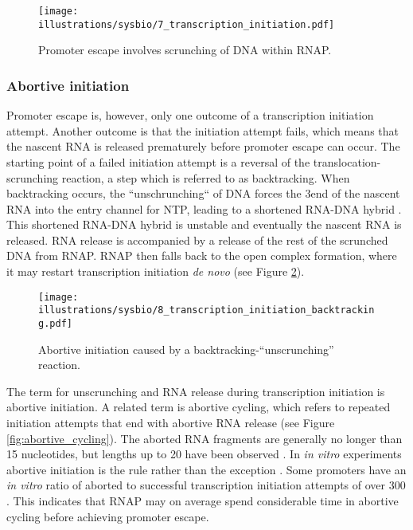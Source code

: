 \begin{figure}[htb]
	\begin{center}
		\texttt{[image: illustrations/sysbio/7\_transcription\_initiation.pdf]}
	\end{center}
	\caption{Promoter escape involves scrunching of DNA within RNAP.}
	\label{fig:simple_escape}
\end{figure}

\subsubsection{Abortive initiation}
Promoter escape is, however, only one outcome of a transcription initiation
attempt. Another outcome is that the initiation attempt fails, which means that
the nascent RNA is released prematurely before promoter escape can occur. The
starting point of a failed initiation attempt is a reversal of the
translocation-scrunching reaction, a step which is referred to as backtracking.
When backtracking occurs, the ``unschrunching`` of DNA forces the 3\ppp end of
the nascent RNA into the entry channel for NTP, leading to a shortened RNA-DNA
hybrid \cite{hsu_initial_2006}. This shortened RNA-DNA hybrid is unstable and
eventually the nascent RNA is released. RNA release is accompanied by a release
of the rest of the scrunched DNA from RNAP. RNAP then falls back to the open
complex formation, where it may restart transcription initiation \textit{de
novo} \cite{lilian_m_promoter_2002} (see Figure \ref{fig:abortive_backtrack}).

\begin{figure}[htb]
	\begin{center}
		\texttt{[image: illustrations/sysbio/8\_transcription\_initiation\_backtracking.pdf]}
	\end{center}
	\caption{Abortive initiation caused by a backtracking-``unscrunching''
	reaction.}
	\label{fig:abortive_backtrack}
\end{figure}

The term for unscrunching and RNA release during transcription initiation is
abortive initiation. A related term is abortive cycling, which refers to
repeated initiation attempts that end with abortive RNA release (see Figure
\ref{fig:abortive_cycling}). The aborted RNA fragments are generally no longer
than 15 nucleotides, but lengths up to 20 have been observed
\cite{chander_alternate_2007}. In \textit{in vitro} experiments abortive
initiation is the rule rather than the exception \cite{lilian_m_promoter_2002}.
Some promoters have an \textit{in vitro} ratio of aborted to successful
transcription initiation attempts of over 300 \cite{hsu_initial_2006}. This
indicates that RNAP may on average spend considerable time in abortive cycling
before achieving promoter escape.

